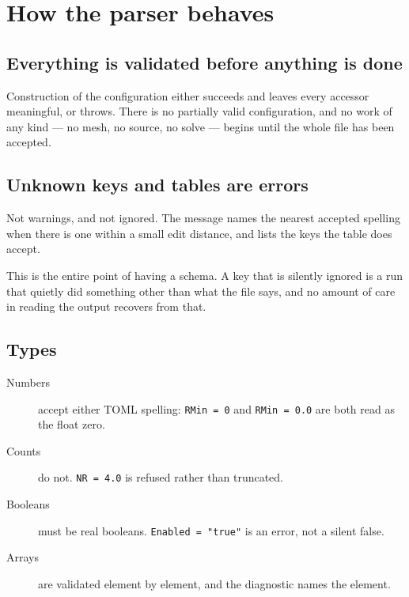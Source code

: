 \section{How the parser behaves}

\subsection{Everything is validated before anything is done}

Construction of the configuration either succeeds and leaves every accessor
meaningful, or throws. There is no partially valid configuration, and no work of
any kind --- no mesh, no source, no solve --- begins until the whole file has
been accepted.

\subsection{Unknown keys and tables are errors}

Not warnings, and not ignored. The message names the nearest accepted spelling
when there is one within a small edit distance, and lists the keys the table
does accept.

This is the entire point of having a schema. A key that is silently ignored is a
run that quietly did something other than what the file says, and no amount of
care in reading the output recovers from that.

\subsection{Types}

\begin{description}

\item[Numbers] accept either TOML spelling: \texttt{RMin = 0} and
	\texttt{RMin = 0.0} are both read as the float zero.

\item[Counts] do not. \texttt{NR = 4.0} is refused rather than truncated.

\item[Booleans] must be real booleans. \texttt{Enabled = "true"} is an error,
	not a silent false.

\item[Arrays] are validated element by element, and the diagnostic names the
	element.

\end{description}

